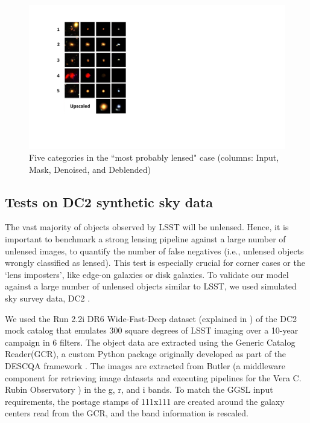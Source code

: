 \documentclass[12pt, twocolumn, apj]{openjournal}
\begin{document}
\begin{figure}[!htp]
\centering
\includegraphics[width=\linewidth]{Figures/gtpt5_categories_V2.pdf}
\caption{Five categories in the ``most probably lensed" case (columns: Input, Mask, Denoised, and Deblended)}
\label{Fig:Five_categores_lensed} 
\end{figure}


\subsection{Tests on DC2 synthetic sky data}

The vast majority of objects observed by LSST will be unlensed. Hence, it is important to benchmark a strong lensing pipeline against a large number of unlensed images, to quantify the number of false negatives (i.e., unlensed objects wrongly classified as lensed). This test is especially crucial for corner cases or the `lens imposters', like edge-on galaxies or disk galaxies. To validate our model against a large number of unlensed objects similar to LSST, we used simulated sky survey data, DC2 \citep{dc2, CosmoDC2}. 

We used the Run 2.2i DR6 Wide-Fast-Deep dataset (explained in \cite{dc2}) of the DC2 mock catalog that emulates 300 square degrees of LSST imaging over a 10-year campaign in 6 filters. The object data are extracted using the Generic Catalog Reader(GCR), a custom Python package originally developed as part of the DESCQA framework \citep{descqa}. The images are extracted from Butler (a middleware component for retrieving image datasets and executing pipelines for the Vera C. Rubin Observatory \citet{Butler2019, Butler2022}) in the g, r, and i bands. To match the GGSL input requirements, the postage stamps of 111x111 are created around the galaxy centers read from the GCR, and the band information is rescaled. 
\end{document}

